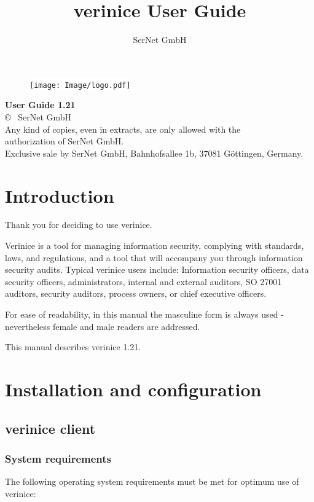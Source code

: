 \documentclass[a4paper,10pt]{book}
\title{verinice User Guide \vnversion{}}
\author{SerNet GmbH}
\newcommand*{\vnversion}{1.21}
\begin{document}

\begin{titlepage}
    \centering
    \vspace{1cm}
    \begin{figure}[htb!]
      \centering
      \colorbox{white}{\texttt{[image: Image/logo.pdf]}}
    \end{figure}
    \huge\textbf{User Guide \vnversion{}}\\
    \vspace{14cm}
    \normalsize
  \copyright{} \the\year\ SerNet GmbH\\
  Any kind of copies, even in extracts, are only allowed with the\\
  authorization of SerNet GmbH.\\
  Exclusive sale by SerNet GmbH, Bahnhofsallee 1b, 37081 Göttingen, Germany.
\end{titlepage}

\tableofcontents

\listoftables

\listoffigures

\chapter{Introduction}
Thank you for deciding to use verinice.

Verinice is a tool for managing information security, complying with standards,
laws, and regulations, and a tool that will accompany you through information
security audits. Typical verinice users include: Information security officers,
data security officers, administrators, internal and external auditors,
SO 27001 auditors, security auditors, process owners, or chief executive
officers.

For ease of readability, in this manual the masculine form is always used -
nevertheless female and male readers are addressed.

This manual describes verinice \vnversion{}.

\newpage
\chapter{Installation and configuration}
\section{verinice client}
\subsection{System requirements}
The following operating system requirements must be met for optimum use of
verinice:
\end{document}

